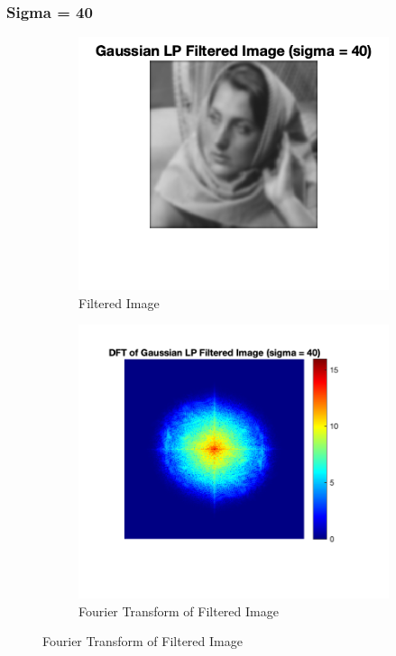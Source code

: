\documentclass[12pt]{article}
\begin{document}
\subsubsection*{Sigma = 40}
\begin{figure}[H]
    \begin{subfigure}{.45\textwidth}
    \centering
      \includegraphics[width=1\linewidth]{../images/barbara_gaussian_LPF_40.png}
      \caption{Filtered Image}
    \end{subfigure}
    \begin{subfigure}{.5\textwidth}
    \centering
      \includegraphics[width=1\linewidth]{../images/barbara_DFT_gaussian_LPF_40.png}
      \caption{Fourier Transform of Filtered Image}
    \end{subfigure}
\end{figure}
\end{document}
